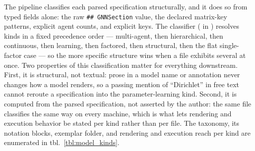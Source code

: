 \documentclass[
  english,
  9pt,
]{extarticle}
\begin{document}
The pipeline classifies each parsed specification structurally, and it
does so from typed fields alone: the raw \texttt{\#\#\ GNNSection}
value, the declared matrix-key patterns, explicit agent counts, and
explicit  keys. The classifier
( in
) resolves kinds in a fixed
precedence order --- multi-agent, then hierarchical, then continuous,
then learning, then factored, then structural, then the flat
single-factor case --- so the more specific structure wins when a file
exhibits several at once. Two properties of this classification matter
for everything downstream. First, it is structural, not textual: prose
in a model name or annotation never changes how a model renders, so a
passing mention of ``Dirichlet'' in free text cannot reroute a
specification into the parameter-learning kind. Second, it is computed
from the parsed specification, not asserted by the author: the same file
classifies the same way on every machine, which is what lets rendering
and execution behavior be stated per kind rather than per file. The
taxonomy, its notation blocks, exemplar folder, and rendering and
execution reach per kind are enumerated in tbl.~\ref{tbl:model_kinds}.
\end{document}
